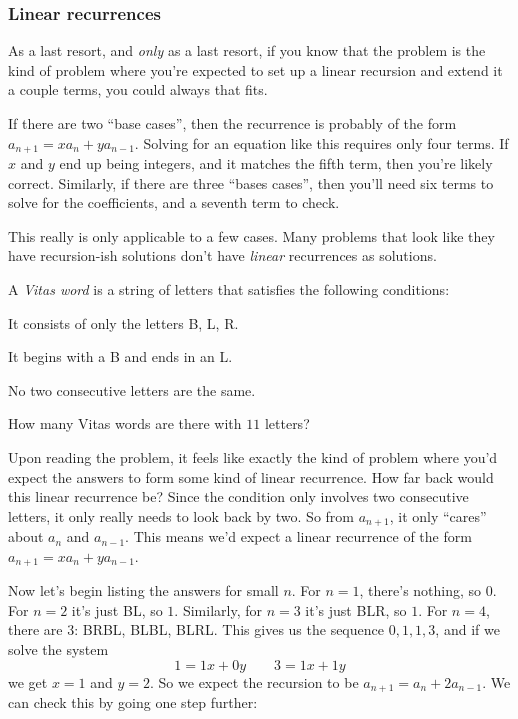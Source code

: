 \documentclass[11pt,paper=letter]{scrartcl}
\begin{document}
\subsubsection{Linear recurrences}

As a last resort, and \textit{only} as a last resort, if you know that the problem is the kind of problem where you're expected to set up a linear recursion and extend it a couple terms, you could always  that fits.

If there are two ``base cases'', then the recurrence is probably of the form $a_{n+1} = xa_n + ya_{n-1}$. Solving for an equation like this requires only four terms. If $x$ and $y$ end up being integers, and it matches the fifth term, then you're likely correct. Similarly, if there are three ``bases cases'', then you'll need six terms to solve for the coefficients, and a seventh term to check.

This really is only applicable to a few cases. Many problems that look like they have recursion-ish solutions don't have \textit{linear} recurrences as solutions.

\begin{exboxed}
  A \emph{Vitas word} is a string of letters that satisfies the following conditions:
  \begin{itemthin}
    \item It consists of only the letters B, L, R.
    \item It begins with a B and ends in an L.
    \item No two consecutive letters are the same.
  \end{itemthin}
  How many Vitas words are there with $11$ letters?
\end{exboxed}

Upon reading the problem, it feels like exactly the kind of problem where you'd expect the answers to form some kind of linear recurrence. How far back would this linear recurrence be? Since the condition only involves two consecutive letters, it only really needs to look back by two. So from $a_{n+1}$, it only ``cares'' about $a_n$ and $a_{n-1}$. This means we'd expect a linear recurrence of the form $a_{n+1} = xa_n + ya_{n-1}$.

Now let's begin listing the answers for small $n$. For $n = 1$, there's nothing, so $0$. For $n = 2$ it's just BL, so $1$. Similarly, for $n = 3$ it's just BLR, so $1$. For $n = 4$, there are $3$: BRBL, BLBL, BLRL. This gives us the sequence $0, 1, 1, 3$, and if we solve the system
\[
  1 = 1x + 0y \qquad 3 = 1x + 1y
\]
we get $x = 1$ and $y = 2$. So we expect the recursion to be $a_{n+1} = a_n + 2a_{n-1}$. We can check this by going one step further:
\end{document}
